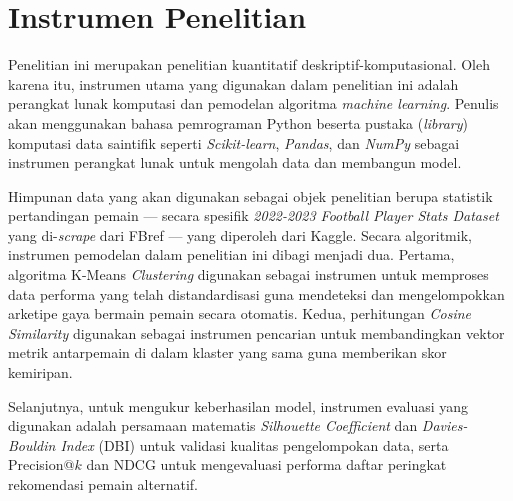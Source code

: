 \section{Instrumen Penelitian}
\label{sec:instrumen}

Penelitian ini merupakan penelitian kuantitatif deskriptif-komputasional. Oleh karena itu, instrumen utama yang digunakan dalam penelitian ini adalah perangkat lunak komputasi dan pemodelan algoritma \emph{machine learning}. Penulis akan menggunakan bahasa pemrograman Python beserta pustaka (\emph{library}) komputasi data saintifik seperti \emph{Scikit-learn}, \emph{Pandas}, dan \emph{NumPy} sebagai instrumen perangkat lunak untuk mengolah data dan membangun model.

Himpunan data yang akan digunakan sebagai objek penelitian berupa statistik pertandingan pemain --- secara spesifik \emph{2022-2023 Football Player Stats Dataset} yang di-\emph{scrape} dari FBref --- yang diperoleh dari Kaggle. Secara algoritmik, instrumen pemodelan dalam penelitian ini dibagi menjadi dua. Pertama, algoritma K-Means \emph{Clustering} digunakan sebagai instrumen untuk memproses data performa yang telah distandardisasi guna mendeteksi dan mengelompokkan arketipe gaya bermain pemain secara otomatis. Kedua, perhitungan \emph{Cosine Similarity} digunakan sebagai instrumen pencarian untuk membandingkan vektor metrik antarpemain di dalam klaster yang sama guna memberikan skor kemiripan.

Selanjutnya, untuk mengukur keberhasilan model, instrumen evaluasi yang digunakan adalah persamaan matematis \emph{Silhouette Coefficient} dan \emph{Davies-Bouldin Index} (DBI) untuk validasi kualitas pengelompokan data, serta Precision@$k$ dan NDCG untuk mengevaluasi performa daftar peringkat rekomendasi pemain alternatif.
